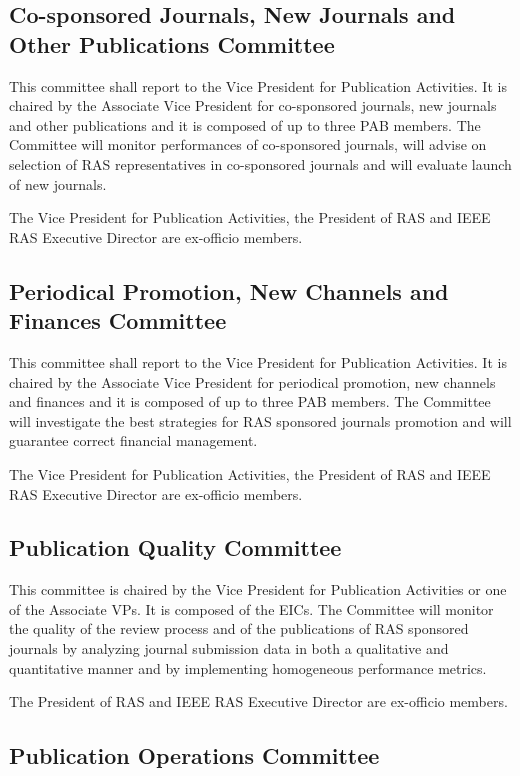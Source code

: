 \documentclass[10pt]{article}
\begin{document}
\subsection{Co-sponsored Journals, New Journals and Other Publications Committee}

This committee shall report to the Vice President for Publication Activities. It is chaired by the Associate Vice President for co-sponsored journals, new journals and other publications and it is composed of up to three PAB members. The Committee will monitor performances of co-sponsored journals, will advise on selection of RAS representatives in co-sponsored journals and will evaluate launch of new journals. 

The Vice President for Publication Activities, the President of RAS and IEEE RAS Executive Director are ex-officio members.


\subsection{Periodical Promotion, New Channels and Finances Committee}

This committee shall report to the Vice President for Publication Activities. It is chaired by the Associate Vice President for periodical promotion, new channels and finances and it is composed of up to three PAB members. The Committee will investigate the best strategies for RAS sponsored journals promotion and will guarantee correct financial management.

The Vice President for Publication Activities, the President of RAS and IEEE RAS Executive Director are ex-officio members.


\subsection{Publication Quality Committee}

This committee is chaired by the Vice President for Publication Activities or one of the Associate VPs. It is composed of the EICs. The Committee will monitor the quality of the review process and of the publications of RAS sponsored journals by analyzing journal submission data in both a qualitative and quantitative manner and by implementing homogeneous performance metrics.

The President of RAS and IEEE RAS Executive Director are ex-officio members.



\subsection{Publication Operations Committee}
\end{document}
